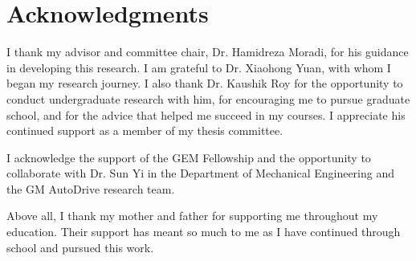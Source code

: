 \chapter*{Acknowledgments}

I thank my advisor and committee chair, Dr. Hamidreza Moradi, for his guidance in developing this research. I am grateful to Dr. Xiaohong Yuan, with whom I began my research journey. I also thank Dr. Kaushik Roy for the opportunity to conduct undergraduate research with him, for encouraging me to pursue graduate school, and for the advice that helped me succeed in my courses. I appreciate his continued support as a member of my thesis committee.

I acknowledge the support of the GEM Fellowship and the opportunity to collaborate with Dr. Sun Yi in the Department of Mechanical Engineering and the GM AutoDrive research team.

Above all, I thank my mother and father for supporting me throughout my education. Their support has meant so much to me as I have continued through school and pursued this work.

